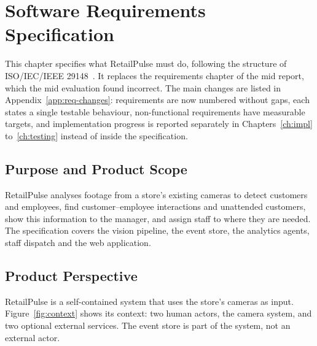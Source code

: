 \chapter{Software Requirements Specification}
\label{ch:srs}

This chapter specifies what RetailPulse must do, following the structure of ISO/IEC/IEEE 29148~\cite{iso29148}. It replaces the requirements chapter of the mid report, which the mid evaluation found incorrect. The main changes are listed in Appendix~\ref{app:req-changes}: requirements are now numbered without gaps, each states a single testable behaviour, non-functional requirements have measurable targets, and implementation progress is reported separately in Chapters~\ref{ch:impl} to~\ref{ch:testing} instead of inside the specification.

\section{Purpose and Product Scope}
RetailPulse analyses footage from a store's existing cameras to detect customers and employees, find customer--employee interactions and unattended customers, show this information to the manager, and assign staff to where they are needed. The specification covers the vision pipeline, the event store, the analytics agents, staff dispatch and the web application.

\section{Product Perspective}
RetailPulse is a self-contained system that uses the store's cameras as input. Figure~\ref{fig:context} shows its context: two human actors, the camera system, and two optional external services. The event store is part of the system, not an external actor.

